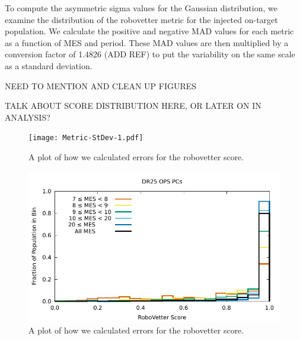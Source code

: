 To compute the asymmetric sigma values for the Gaussian distribution, we examine the distribution of the robovetter metric for the injected on-target population. We calculate the positive and negative MAD values for each metric as a function of MES and period. These MAD values are then multiplied by a conversion factor of 1.4826 (ADD REF) to put the variability on the same scale as a standard deviation.

NEED TO MENTION AND CLEAN UP FIGURES

TALK ABOUT SCORE DISTRIBUTION HERE, OR LATER ON IN ANALYSIS?

\begin{figure}
\centering
\texttt{[image: Metric-StDev-1.pdf]}
\caption{A plot of how we calculated errors for the robovetter score.}
\label{score-fig-1}
\end{figure}

\begin{figure}
\centering
\includegraphics[width=\linewidth]{Scores-1.pdf}
\caption{A plot of how we calculated errors for the robovetter score.}
\label{score-fig-2}
\end{figure}

